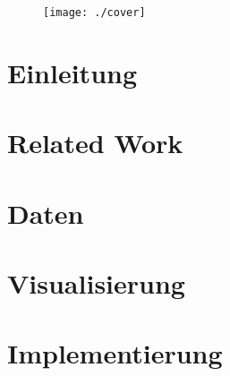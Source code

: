 \begin{figure}
\centering
\texttt{[image: ./cover]}
\end{figure}



\tableofcontents


\cleardoublepage
{} %

\chapter{Einleitung}
\label{chap:einleitung}


\chapter{Related Work}
\label{chap:related_work}


\chapter{Daten}
\label{chap:daten}


\chapter{Visualisierung}
\label{chap:visualization}


\chapter{Implementierung}
\label{chap:Implementierung}


